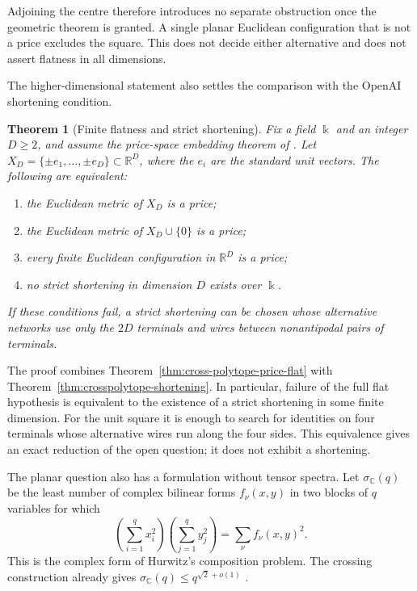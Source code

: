 \documentclass[11pt,a4paper]{article}
\newcommand{\C}{\mathbb C}
\newcommand{\kk}{\Bbbk}
\newtheorem{theorem}{Theorem}[section]
\theoremstyle{definition}
\theoremstyle{remark}
\begin{document}
Adjoining the centre therefore introduces no separate obstruction once
the geometric theorem is granted. A single planar Euclidean configuration
that is not a price excludes the square. This does not decide either
alternative and does not assert flatness in all dimensions.

The higher-dimensional statement also settles the comparison with
the OpenAI shortening condition.

\begin{theorem}[Finite flatness and strict shortening]
\label{thm:intro-flat-shortening}
Fix a field $\kk$ and an integer $D\geq2$, and assume the
price-space embedding theorem of
\cite[Proposition C.3, p.~28]{Anthropic2026}.
Let $X_D=\{\pm e_1,\ldots,\pm e_D\}\subset\mathbb R^D$,
where the $e_i$ are the standard unit vectors.
The following are equivalent:
\begin{enumerate}
\item the Euclidean metric of $X_D$ is a price;
\item the Euclidean metric of $X_D\cup\{0\}$ is a price;
\item every finite Euclidean configuration in $\mathbb R^D$ is a price;
\item no strict shortening in dimension $D$ exists over $\kk$.
\end{enumerate}
If these conditions fail, a strict shortening can be chosen
whose alternative networks use only the $2D$ terminals and
wires between nonantipodal pairs of terminals.
\end{theorem}

The proof combines Theorem~\ref{thm:cross-polytope-price-flat}
with Theorem~\ref{thm:crosspolytope-shortening}.
In particular, failure of the full flat hypothesis is equivalent
to the existence of a strict shortening in some finite dimension.
For the unit square it is enough to search for identities on
four terminals whose alternative wires run along the four sides.
This equivalence gives an exact reduction of the open question;
it does not exhibit a shortening.

The planar question also has a formulation without tensor spectra.
Let $\sigma_\C(q)$ be the least number of complex bilinear forms
$f_\nu(x,y)$ in two blocks of $q$ variables for which
\[
 \left(\sum_{i=1}^q x_i^2\right)
 \left(\sum_{j=1}^q y_j^2\right)=\sum_\nu f_\nu(x,y)^2.
\]
This is the complex form of Hurwitz's composition problem.
The crossing construction already gives
$\sigma_\C(q)\leq q^{\sqrt2+o(1)}$
\cite[Corollary 3]{Khoruzhii2026}.
\end{document}
